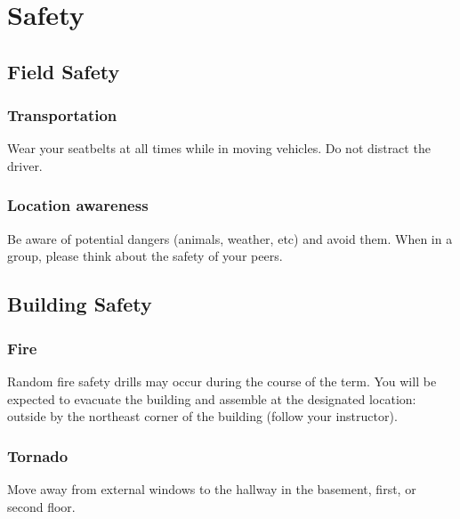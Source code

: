 \documentclass[11pt,]{article}
\begin{document}
\hypertarget{safety}{%
\section{Safety}\label{safety}}

\hypertarget{field-safety}{%
\subsection{Field Safety}\label{field-safety}}

\hypertarget{transportation}{%
\subsubsection{Transportation}\label{transportation}}

Wear your seatbelts at all times while in moving vehicles. Do not
distract the driver.

\hypertarget{location-awareness}{%
\subsubsection{Location awareness}\label{location-awareness}}

Be aware of potential dangers (animals, weather, etc) and avoid them.
When in a group, please think about the safety of your peers.

\hypertarget{building-safety}{%
\subsection{Building Safety}\label{building-safety}}

\hypertarget{fire}{%
\subsubsection{Fire}\label{fire}}

Random fire safety drills may occur during the course of the term. You
will be expected to evacuate the building and assemble at the designated
location: outside by the northeast corner of the building (follow your
instructor).

\hypertarget{tornado}{%
\subsubsection{Tornado}\label{tornado}}

Move away from external windows to the hallway in the basement, first,
or second floor.
\end{document}
